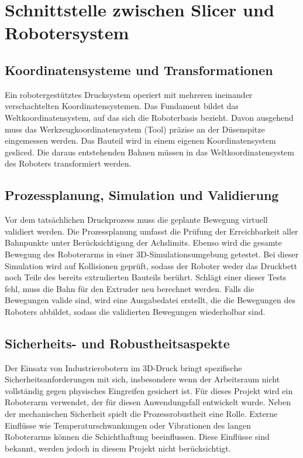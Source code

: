     \section{Schnittstelle zwischen Slicer und Robotersystem}\label{sec:interface-between-slicer-and-robot-system}
        \subsection{Koordinatensysteme und Transformationen}\label{subsec:coordinate-systems-and-transformations}
        Ein robotergestütztes Drucksystem operiert mit mehreren ineinander verschachtelten Koordinatensystemen.
        Das Fundament bildet das Weltkoordinatensystem, auf das sich die Roboterbasis bezieht.
        Davon ausgehend muss das Werkzeugkoordinatensystem (Tool) präzise an der Düsenspitze eingemessen werden.
        Das Bauteil wird in einem eigenen Koordinatensystem gesliced.
        Die daraus entstehenden Bahnen müssen in das Weltkoordinatensystem des Roboters transformiert werden.

        \subsection{Prozessplanung, Simulation und Validierung}\label{subsec:process-planning-simulation-and-validation}
        Vor dem tatsächlichen Druckprozess muss die geplante Bewegung virtuell validiert werden.
        Die Prozessplanung umfasst die Prüfung der Erreichbarkeit aller Bahnpunkte unter Berücksichtigung der Achslimits.
        Ebenso wird die gesamte Bewegung des Roboterarms in einer 3D-Simulationsumgebung getestet.
        Bei dieser Simulation wird auf Kollisionen geprüft, sodass der Roboter weder das Druckbett noch Teile des bereits extrudierten Bauteils berührt.
        Schlägt einer dieser Tests fehl, muss die Bahn für den Extruder neu berechnet werden.
        Falls die Bewegungen valide sind, wird eine Ausgabedatei erstellt, die die Bewegungen des Roboters abbildet, sodass die validierten Bewegungen wiederholbar sind.

        \subsection{Sicherheits- und Robustheitsaspekte}\label{subsec:safety-and-robustness-aspects}
        Der Einsatz von Industrierobotern im 3D-Druck bringt spezifische Sicherheitsanforderungen mit sich,
        insbesondere wenn der Arbeitsraum nicht vollständig gegen physisches Eingreifen gesichert ist.
        Für dieses Projekt wird ein Roboterarm verwendet, der für diesen Anwendungsfall entwickelt wurde.
        Neben der mechanischen Sicherheit spielt die Prozessrobustheit eine Rolle.
        Externe Einflüsse wie Temperaturschwankungen oder Vibrationen des langen Roboterarms können die Schichthaftung beeinflussen.
        Diese Einflüsse sind bekannt, werden jedoch in diesem Projekt nicht berücksichtigt.

